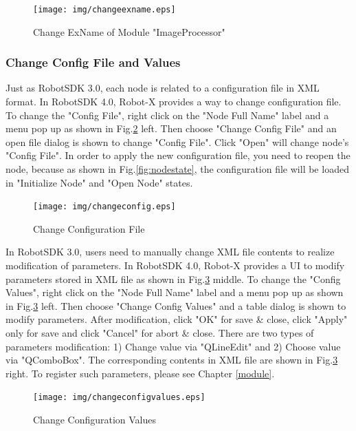 \documentclass[a4paper,10pt]{book}
\begin{document}
\begin{figure}
 \centering
 \texttt{[image: img/changeexname.eps]}
 \caption{Change ExName of Module "ImageProcessor"}
 \label{fig:changeexname}
\end{figure}

\subsubsection{Change Config File and Values}

Just as RobotSDK 3.0, each node is related to a configuration file in XML format. In RobotSDK 4.0, Robot-X provides a way to change configuration file. To change the "Config File", right click on the "Node Full Name" label and a menu pop up as shown in Fig.\ref{fig:changeconfig} left. Then choose "Change Config File" and an open file dialog is shown to change "Config File". Click "Open" will change node's "Config File". In order to apply the new configuration file, you need to reopen the node, because as shown in Fig.\ref{fig:nodestate}, the configuration file will be loaded in "Initialize Node" and "Open Node" states.

\begin{figure}
 \centering
 \texttt{[image: img/changeconfig.eps]}
 \caption{Change Configuration File}
 \label{fig:changeconfig}
\end{figure}

In RobotSDK 3.0, users need to manually change XML file contents to realize modification of parameters. In RobotSDK 4.0, Robot-X provides a UI to modify parameters stored in XML file as shown in Fig.\ref{fig:changeconfigvalues} middle. To change the "Config Values", right click on the "Node Full Name" label and a menu pop up as shown in Fig.\ref{fig:changeconfigvalues} left. Then choose "Change Config Values" and a table dialog is shown to modify parameters.  After modification, click "OK" for save \& close, click "Apply" only for save and click "Cancel" for abort \& close. There are two types of parameters modification: 1) Change value via "QLineEdit" and 2) Choose value via "QComboBox". The corresponding contents in XML file are shown in Fig.\ref{fig:changeconfigvalues} right. To register such parameters, please see Chapter \ref{module}.

\begin{figure}
 \centering
 \texttt{[image: img/changeconfigvalues.eps]}
 \caption{Change Configuration Values}
 \label{fig:changeconfigvalues}
\end{figure}
\end{document}
